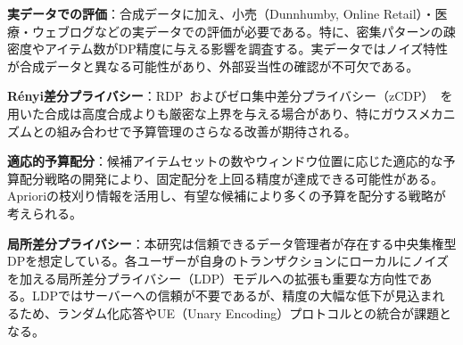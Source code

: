 \textbf{実データでの評価}：合成データに加え、小売（Dunnhumby, Online Retail）・医療・ウェブログなどの実データでの評価が必要である。特に、密集パターンの疎密度やアイテム数がDP精度に与える影響を調査する。実データではノイズ特性が合成データと異なる可能性があり、外部妥当性の確認が不可欠である。

\textbf{R\'{e}nyi差分プライバシー}：RDP~\cite{mironov2017renyi}およびゼロ集中差分プライバシー（zCDP）~\cite{bun2016concentrated}を用いた合成は高度合成よりも厳密な上界を与える場合があり、特にガウスメカニズムとの組み合わせで予算管理のさらなる改善が期待される。

\textbf{適応的予算配分}：候補アイテムセットの数やウィンドウ位置に応じた適応的な予算配分戦略の開発により、固定配分を上回る精度が達成できる可能性がある。Aprioriの枝刈り情報を活用し、有望な候補により多くの予算を配分する戦略が考えられる。

\textbf{局所差分プライバシー}：本研究は信頼できるデータ管理者が存在する中央集権型DPを想定している。各ユーザーが自身のトランザクションにローカルにノイズを加える局所差分プライバシー（LDP）モデルへの拡張も重要な方向性である。LDPではサーバーへの信頼が不要であるが、精度の大幅な低下が見込まれるため、ランダム化応答やUE（Unary Encoding）プロトコルとの統合が課題となる。
